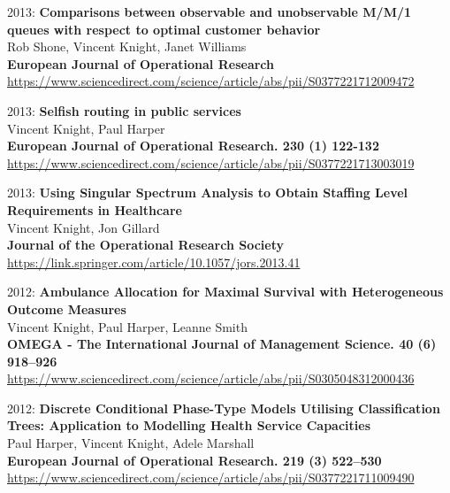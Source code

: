 \documentclass[10pt]{article}
\begin{document}
\begin{etaremune}
\item
  2013: \textbf{Comparisons between observable and unobservable M/M/1 queues with respect to optimal customer behavior}\\
  Rob Shone, Vincent Knight, Janet Williams\\
  \textbf{European Journal of Operational Research}\\
  \url{https://www.sciencedirect.com/science/article/abs/pii/S0377221712009472}\\
  

\item
  2013: \textbf{Selfish routing in public services}\\
  Vincent Knight, Paul Harper\\
  \textbf{European Journal of Operational Research. 230 (1) 122-132}\\
  \url{https://www.sciencedirect.com/science/article/abs/pii/S0377221713003019}\\
  

\item
  2013: \textbf{Using Singular Spectrum Analysis to Obtain Staffing Level Requirements in Healthcare}\\
  Vincent Knight, Jon Gillard\\
  \textbf{Journal of the Operational Research Society}\\
  \url{https://link.springer.com/article/10.1057/jors.2013.41}\\
  

\item
  2012: \textbf{Ambulance Allocation for Maximal Survival with Heterogeneous Outcome Measures}\\
  Vincent Knight, Paul Harper, Leanne Smith\\
  \textbf{OMEGA - The International Journal of Management Science. 40 (6) 918--926}\\
  \url{https://www.sciencedirect.com/science/article/abs/pii/S0305048312000436}\\
  

\item
  2012: \textbf{Discrete Conditional Phase-Type Models Utilising Classification Trees: Application to Modelling Health Service Capacities}\\
  Paul Harper, Vincent Knight, Adele Marshall\\
  \textbf{European Journal of Operational Research. 219 (3) 522--530}\\
  \url{https://www.sciencedirect.com/science/article/abs/pii/S0377221711009490}\\
  


\end{etaremune}
\end{document}
